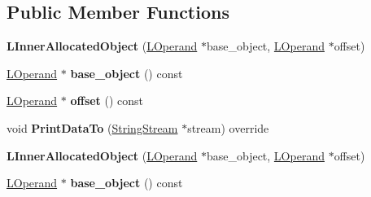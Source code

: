 \subsection*{Public Member Functions}
\begin{DoxyCompactItemize}
\item 
{\bfseries L\+Inner\+Allocated\+Object} (\hyperlink{classv8_1_1internal_1_1_l_operand}{L\+Operand} $\ast$base\+\_\+object, \hyperlink{classv8_1_1internal_1_1_l_operand}{L\+Operand} $\ast$offset)\hypertarget{classv8_1_1internal_1_1_l_inner_allocated_object_a419dc26ada4de7390eebb1821b06ad1b}{}\label{classv8_1_1internal_1_1_l_inner_allocated_object_a419dc26ada4de7390eebb1821b06ad1b}

\item 
\hyperlink{classv8_1_1internal_1_1_l_operand}{L\+Operand} $\ast$ {\bfseries base\+\_\+object} () const \hypertarget{classv8_1_1internal_1_1_l_inner_allocated_object_a9ca3dd7ca4f2e85011c27189c1fe5b73}{}\label{classv8_1_1internal_1_1_l_inner_allocated_object_a9ca3dd7ca4f2e85011c27189c1fe5b73}

\item 
\hyperlink{classv8_1_1internal_1_1_l_operand}{L\+Operand} $\ast$ {\bfseries offset} () const \hypertarget{classv8_1_1internal_1_1_l_inner_allocated_object_aad92bbf188d561ff04019227528be0bf}{}\label{classv8_1_1internal_1_1_l_inner_allocated_object_aad92bbf188d561ff04019227528be0bf}

\item 
void {\bfseries Print\+Data\+To} (\hyperlink{classv8_1_1internal_1_1_string_stream}{String\+Stream} $\ast$stream) override\hypertarget{classv8_1_1internal_1_1_l_inner_allocated_object_a9651a9ba04db7632487d46ffc2b9fba2}{}\label{classv8_1_1internal_1_1_l_inner_allocated_object_a9651a9ba04db7632487d46ffc2b9fba2}

\item 
{\bfseries L\+Inner\+Allocated\+Object} (\hyperlink{classv8_1_1internal_1_1_l_operand}{L\+Operand} $\ast$base\+\_\+object, \hyperlink{classv8_1_1internal_1_1_l_operand}{L\+Operand} $\ast$offset)\hypertarget{classv8_1_1internal_1_1_l_inner_allocated_object_a419dc26ada4de7390eebb1821b06ad1b}{}\label{classv8_1_1internal_1_1_l_inner_allocated_object_a419dc26ada4de7390eebb1821b06ad1b}

\item 
\hyperlink{classv8_1_1internal_1_1_l_operand}{L\+Operand} $\ast$ {\bfseries base\+\_\+object} () const \hypertarget{classv8_1_1internal_1_1_l_inner_allocated_object_a9ca3dd7ca4f2e85011c27189c1fe5b73}{}\label{classv8_1_1internal_1_1_l_inner_allocated_object_a9ca3dd7ca4f2e85011c27189c1fe5b73}


\end{DoxyCompactItemize}
